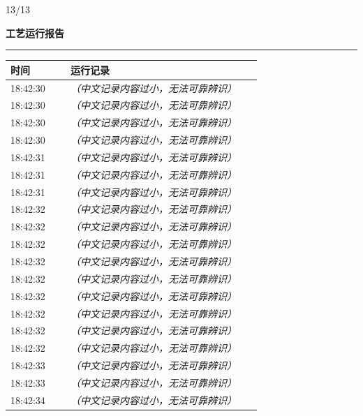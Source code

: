 \documentclass[UTF8,10pt,a4paper,fontset=fandol]{ctexart}
\newcommand{\handwritten}[1]{#1}
\begin{document}
\handwritten{13/13}

\newpage

\noindent
\begin{minipage}[t]{0.47\linewidth}
\centering
\textbf{工艺运行报告}\\[-2pt]
\rule{\linewidth}{0.4pt}

\scriptsize
\begin{tabular}{|p{0.22\linewidth}|p{0.70\linewidth}|}
\hline
时间 & 运行记录 \\ \hline
18:42:30 & \textit{（中文记录内容过小，无法可靠辨识）} \\ \hline
18:42:30 & \textit{（中文记录内容过小，无法可靠辨识）} \\ \hline
18:42:30 & \textit{（中文记录内容过小，无法可靠辨识）} \\ \hline
18:42:30 & \textit{（中文记录内容过小，无法可靠辨识）} \\ \hline
18:42:31 & \textit{（中文记录内容过小，无法可靠辨识）} \\ \hline
18:42:31 & \textit{（中文记录内容过小，无法可靠辨识）} \\ \hline
18:42:31 & \textit{（中文记录内容过小，无法可靠辨识）} \\ \hline
18:42:32 & \textit{（中文记录内容过小，无法可靠辨识）} \\ \hline
18:42:32 & \textit{（中文记录内容过小，无法可靠辨识）} \\ \hline
18:42:32 & \textit{（中文记录内容过小，无法可靠辨识）} \\ \hline
18:42:32 & \textit{（中文记录内容过小，无法可靠辨识）} \\ \hline
18:42:32 & \textit{（中文记录内容过小，无法可靠辨识）} \\ \hline
18:42:32 & \textit{（中文记录内容过小，无法可靠辨识）} \\ \hline
18:42:32 & \textit{（中文记录内容过小，无法可靠辨识）} \\ \hline
18:42:32 & \textit{（中文记录内容过小，无法可靠辨识）} \\ \hline
18:42:32 & \textit{（中文记录内容过小，无法可靠辨识）} \\ \hline
18:42:33 & \textit{（中文记录内容过小，无法可靠辨识）} \\ \hline
18:42:33 & \textit{（中文记录内容过小，无法可靠辨识）} \\ \hline
18:42:34 & \textit{（中文记录内容过小，无法可靠辨识）} \\ \hline

\end{tabular}
\end{minipage}
\end{document}
